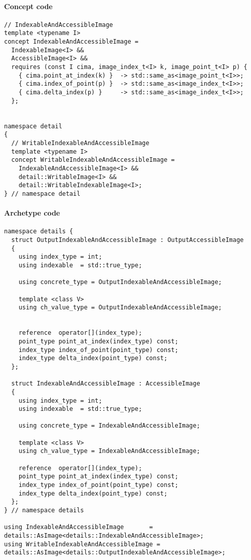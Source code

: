 \paragraph{Concept code}

\begin{verbatim}
// IndexableAndAccessibleImage
template <typename I>
concept IndexableAndAccessibleImage =
  IndexableImage<I> &&
  AccessibleImage<I> &&
  requires (const I cima, image_index_t<I> k, image_point_t<I> p) {
    { cima.point_at_index(k) }  -> std::same_as<image_point_t<I>>;
    { cima.index_of_point(p) }  -> std::same_as<image_index_t<I>>;
    { cima.delta_index(p) }     -> std::same_as<image_index_t<I>>;
  };


namespace detail
{
  // WritableIndexableAndAccessibleImage
  template <typename I>
  concept WritableIndexableAndAccessibleImage =
    IndexableAndAccessibleImage<I> &&
    detail::WritableImage<I> &&
    detail::WritableIndexableImage<I>;
} // namespace detail
\end{verbatim}

\paragraph{Archetype code}

\begin{verbatim}
namespace details {
  struct OutputIndexableAndAccessibleImage : OutputAccessibleImage
  {
    using index_type = int;
    using indexable  = std::true_type;

    using concrete_type = OutputIndexableAndAccessibleImage;

    template <class V>
    using ch_value_type = OutputIndexableAndAccessibleImage;


    reference  operator[](index_type);
    point_type point_at_index(index_type) const;
    index_type index_of_point(point_type) const;
    index_type delta_index(point_type) const;
  };

  struct IndexableAndAccessibleImage : AccessibleImage
  {
    using index_type = int;
    using indexable  = std::true_type;

    using concrete_type = IndexableAndAccessibleImage;

    template <class V>
    using ch_value_type = IndexableAndAccessibleImage;

    reference  operator[](index_type);
    point_type point_at_index(index_type) const;
    index_type index_of_point(point_type) const;
    index_type delta_index(point_type) const;
  };
} // namespace details

using IndexableAndAccessibleImage       = details::AsImage<details::IndexableAndAccessibleImage>;
using WritableIndexableAndAccessibleImage = details::AsImage<details::OutputIndexableAndAccessibleImage>;
\end{verbatim}


